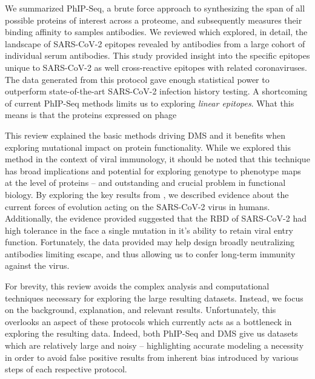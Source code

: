 \documentclass{article}
\begin{document}
We summarized PhIP-Seq, a brute force approach to synthesizing the span of all possible proteins of interest across a proteome, and subsequently measures their binding affinity to samples antibodies.
We reviewed \citet{Shrock2020} which explored, in detail, the landscape of SARS-CoV-2 epitopes revealed by antibodies from a large cohort of individual serum antibodies.
This study provided insight into the specific epitopes unique to SARS-CoV-2 as well cross-reactive epitopes with related coronaviruses.
The data generated from this protocol gave enough statistical power to outperform state-of-the-art SARS-CoV-2 infection history testing.
A shortcoming of current PhIP-Seq methods limits us to exploring \textit{linear epitopes}.
What this means is that the proteins expressed on phage 

This review explained the basic methods driving DMS and it benefits when exploring mutational impact on protein functionality.
While we explored this method in the context of viral immunology, it should be noted that this technique has broad implications and potential for exploring genotype to phenotype maps at the level of proteins -- and outstanding and crucial problem in functional biology.
By exploring the key results from \citet{Starr2020}, we described evidence about the current forces of evolution acting on the SARS-CoV-2 virus in humans.
Additionally, the evidence provided suggested that the RBD of SARS-CoV-2 had high tolerance in the face a single mutation in it's ability to retain viral entry function.
Fortunately, the data provided may help design broadly neutralizing antibodies limiting escape, and thus allowing us to confer long-term immunity against the virus.

For brevity, this review avoids the complex analysis and computational techniques necessary for exploring the large resulting datasets.
Instead, we focus on the background, explanation, and relevant results.
Unfortunately, this overlooks an aspect of these protocols which currently acts as a bottleneck in exploring the resulting data.
Indeed, both PhIP-Seq and DMS give us datasets which are relatively large and noisy -- highlighting accurate modeling a necessity in order to avoid false positive results from inherent bias introduced by various steps of each respective protocol.
\end{document}
